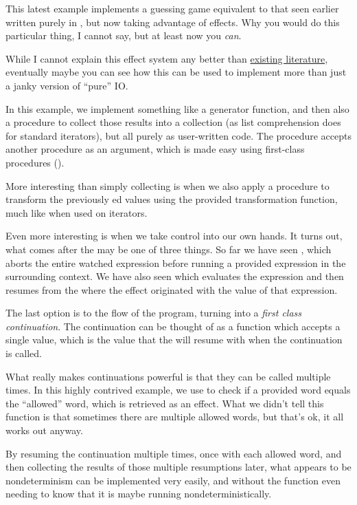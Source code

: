 This latest example implements a guessing game equivalent to that seen earlier
written purely in \Prose{}, but now taking advantage of effects. Why you would
do this particular thing, I cannot say, but at least now you \emph{can}.

While I cannot explain this effect system any better than
\href{https://www.eff-lang.org/handlers-tutorial.pdf}{existing literature},
eventually maybe you can see how this can be used to implement more than just
a janky version of ``pure'' IO.


In this example, we implement something like a generator function, and then
also a procedure to collect those results into a collection (as list comprehension
does for standard iterators), but all purely as user-written code. The
 procedure accepts another procedure as an argument, which is
made easy using first-class procedures ().

More interesting than simply collecting is when we also apply a 
procedure to transform the previously ed values using the provided
transformation function, much like  when used on iterators.

Even more interesting is when we take control into our own hands. It
turns out, what comes after the  may be one of three things. So
far we have seen , which aborts the entire watched expression
before running a provided expression in the surrounding context. We have
also seen  which evaluates the expression and then resumes
from the  where the effect originated with the value of that
expression.

The last option is to  the flow of the program, turning 
into a \emph{first class continuation}. The continuation can be thought of as
a function which accepts a single value, which is the value that the
 will resume with when the continuation is called.


What really makes continuations powerful is that they can be called
multiple times. In this highly contrived example, we use \op{==} to
check if a provided word equals the ``allowed'' word, which is retrieved
as an effect. What we didn't tell this function is that sometimes there
are multiple allowed words, but that's ok, it all works out anyway.

By resuming the continuation multiple times, once with each allowed
word, and then collecting the results of those multiple resumptions
later, what appears to be nondeterminism can be implemented very
easily, and without the function even needing to know that it is
maybe running nondeterministically.

